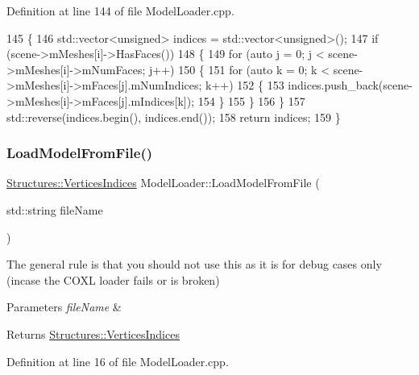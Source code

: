Definition at line 144 of file Model\+Loader.\+cpp.


\begin{DoxyCode}
145 \{
146     std::vector<unsigned> indices = std::vector<unsigned>();
147     \textcolor{keywordflow}{if} (scene->mMeshes[i]->HasFaces())
148     \{
149         \textcolor{keywordflow}{for} (\textcolor{keyword}{auto} j = 0; j < scene->mMeshes[i]->mNumFaces; j++)
150         \{
151             \textcolor{keywordflow}{for} (\textcolor{keyword}{auto} k = 0; k < scene->mMeshes[i]->mFaces[j].mNumIndices; k++)
152             \{
153                 indices.push\_back(scene->mMeshes[i]->mFaces[j].mIndices[k]);
154             \}
155         \}
156     \}
157     std::reverse(indices.begin(), indices.end());
158     \textcolor{keywordflow}{return} indices;
159 \}
\end{DoxyCode}
\mbox{\label{class_model_loader_aa70efbdc2fff6bf8208fcc76cfd4a464}} 
\subsubsection{\texorpdfstring{Load\+Model\+From\+File()}{LoadModelFromFile()}}
{\footnotesize\ttfamily \mbox{\hyperlink{struct_structures_1_1_vertices_indices}{Structures\+::\+Vertices\+Indices}} Model\+Loader\+::\+Load\+Model\+From\+File (\begin{DoxyParamCaption}\item[{std\+::string}]{file\+Name }\end{DoxyParamCaption})}



The general rule is that you should not use this as it is for debug cases only (incase the C\+O\+XL loader fails or is broken) 


\begin{DoxyParams}{Parameters}
{\em file\+Name} & \\
\hline
\end{DoxyParams}
\begin{DoxyReturn}{Returns}
\mbox{\hyperlink{struct_structures_1_1_vertices_indices}{Structures\+::\+Vertices\+Indices}} 
\end{DoxyReturn}


Definition at line 16 of file Model\+Loader.\+cpp.


